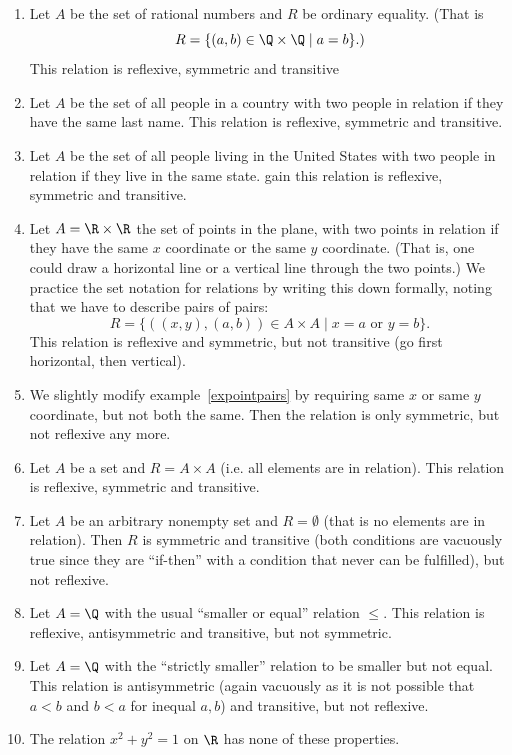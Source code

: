 \begin{enumerate}
\item
Let $A$ be the set of rational numbers and $R$ be ordinary equality. (That is 
\[
R=\{(a,b)\in\Q\times\Q\mid a=b\}.)
\]
This relation is reflexive, symmetric and transitive
\item
Let $A$ be the set of all people in a country with two people in relation if they have
the same last name. This relation is reflexive, symmetric and transitive.
\item
Let $A$ be the set of all people living in the United States
 with two people in
relation if they live in the same state. gain this relation is reflexive, symmetric and
transitive.
\item
\label{expointpairs}
Let $A=\R\times\R$ the set of points in the plane, with two points in relation
if they have the same $x$ coordinate or the same $y$ coordinate. (That is, one could
draw a horizontal line or a vertical line through the two points.)
We practice the set notation for relations by writing this down formally, noting that
we have to describe pairs of pairs:
\[
R=\{((x,y),(a,b))\in A\times A\mid x=a \mbox{\ or\ }y=b\}.
\]
This relation is reflexive and symmetric, but not transitive (go first horizontal, then
vertical).
\item
We slightly modify example~\ref{expointpairs} by requiring same $x$ or same $y$
coordinate, but not both the same. Then the relation is only symmetric, but not
reflexive any more.
\item
Let $A$ be a set and $R=A\times A$ (i.e. all elements are in relation). This relation
is reflexive, symmetric and transitive.
\item
Let $A$ be an arbitrary nonempty set and $R=\emptyset$ (that is no elements are in
relation). Then $R$ is symmetric and transitive (both conditions are vacuously true
since they are ``if-then'' with a condition that never can be fulfilled), but not
reflexive.
\item Let $A=\Q$ with the usual ``smaller or equal'' relation $\le$. This relation is
reflexive, antisymmetric and transitive, but not symmetric.
\item Let $A=\Q$ with the ``strictly smaller'' relation to be smaller but not equal. 
This relation is antisymmetric (again vacuously as it is not possible that $a<b$ and
$b<a$ for inequal $a,b$) and transitive, but not reflexive.
\item The relation $x^2+y^2=1$ on $\R$ has none of these properties.
\end{enumerate}

